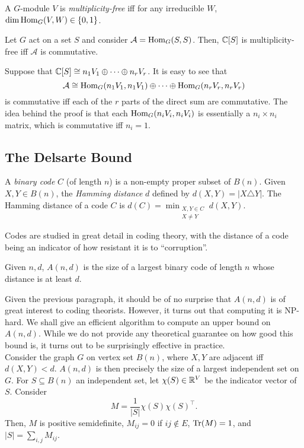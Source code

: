 	\begin{fdef}
		A $G$-module $V$ is \emph{multiplicity-free} iff for any irreducible $W$, $\dim \operatorname{Hom}_G(V,W) \in \{0,1\}$.
	\end{fdef}

	\begin{flem}
		Let $G$ act on a set $S$ and consider $\mathcal{A} = \operatorname{Hom}_G(S,S)$. Then, $\mathbb{C}[S]$ is multiplicity-free iff $\mathcal{A}$ is commutative.
	\end{flem}
	Suppose that $\mathbb{C}[S] \cong n_1 V_1 \oplus \cdots \oplus n_r V_r$. It is easy to see that
	\[ \mathcal{A} \cong \operatorname{Hom}_G(n_1 V_1, n_1 V_1) \oplus \cdots \oplus \operatorname{Hom}_G(n_r V_r, n_r V_r) \]
	is commutative iff each of the $r$ parts of the direct sum are commutative. The idea behind the proof is that each $\operatorname{Hom}_G(n_i V_i, n_i V_i)$ is essentially a $n_i \times n_i$ matrix, which is commutative iff $n_i = 1$.

\subsection{The Delsarte Bound}

	\begin{fdef}
		A \emph{binary code} $C$ (of length $n$) is a non-empty proper subset of $B(n)$. Given $X,Y \in B(n)$, the \emph{Hamming distance} $d$ defined by $d(X,Y) = |X \triangle Y|$. The Hamming distance of a code $C$ is $d(C) = \min_{\substack{X,Y \in C \\ X \ne Y}} d(X,Y)$.
	\end{fdef}

	Codes are studied in great detail in coding theory, with the distance of a code being an indicator of how resistant it is to ``corruption''.

	\begin{fdef}
		Given $n,d$, $A(n,d)$ is the size of a largest binary code of length $n$ whose distance is at least $d$.
	\end{fdef}

	Given the previous paragraph, it should be of no surprise that $A(n,d)$ is of great interest to coding theorists. However, it turns out that computing it is \textsf{NP}-hard. We shall give an efficient algorithm to compute an upper bound on $A(n,d)$. While we do not provide any theoretical guarantee on how good this bound is, it turns out to be surprisingly effective in practice.\\

	Consider the graph $G$ on vertex set $B(n)$, where $X,Y$ are adjacent iff $d(X,Y) < d$. $A(n,d)$ is then precisely the size of a largest independent set on $G$. For $S \subseteq B(n)$ an independent set, let $\chi(S) \in \mathbb{R}^V$ be the indicator vector of $S$. Consider
	\[ M = \frac{1}{|S|} \chi(S) \chi(S)^\top. \]
	Then, $M$ is positive semidefinite, $M_{ij} = 0$ if $ij \not\in E$, $\operatorname{Tr}(M) = 1$, and $|S| = \sum_{i,j} M_{ij}$.

